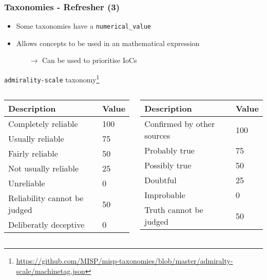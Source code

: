 \begin{frame}
    \frametitle{Taxonomies - Refresher (3)}
    \begin{itemize}
        \item Some taxonomies have a \texttt{numerical\_value}
        \item Allows concepts to be used in an mathematical expression
        \begin{itemize}
            \item[$\rightarrow$] Can be used to prioritise IoCs
        \end{itemize}
    \end{itemize}
    \vspace{0.5cm}

    \begin{footnotesize}
    \texttt{admirality-scale} taxonomy\footnote{\url{https://github.com/MISP/misp-taxonomies/blob/master/admiralty-scale/machinetag.json}}
    \begin{columns}[T] %
    \begin{column}{.40\textwidth}
        \begin{tabular}{|ll|}
            \hline
            \textbf{Description} & \textbf{Value}\\
            \hline
            Completely reliable & 100\\
            Usually reliable & 75\\
            Fairly reliable & 50\\
            Not usually reliable & 25\\
            Unreliable & 0\\
            Reliability cannot be judged & 50\\
            Deliberatly deceptive & 0\\
            \hline
        \end{tabular}
    \end{column}%
    \hfill%
    \begin{column}{.48\textwidth}
        \begin{tabular}{|ll|}
            \hline
            \textbf{Description} & \textbf{Value}\\
            \hline
            Confirmed by other sources & 100\\
            Probably true & 75\\
            Possibly true & 50\\
            Doubtful & 25\\
            Improbable & 0\\
            Truth cannot be judged & 50\\
            \hline
        \end{tabular}
    \end{column}%
    \end{columns}
    \end{footnotesize}

\end{frame}


